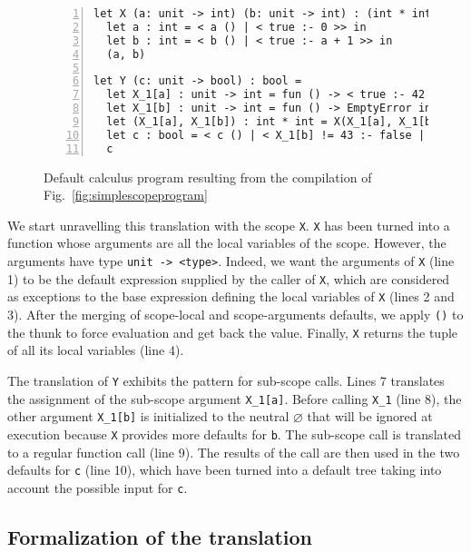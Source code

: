 \documentclass[11pt,a4paper]{article}
\newcommand{\synvar}[1]{\ensuremath{#1}}
\newcommand{\synemptydefault}{\synvar{\varnothing}}
\begin{document}
\begin{figure}
\begin{Verbatim}[frame=lines,label=Simple default program, numbers=left, framesep=10pt, samepage=true]
let X (a: unit -> int) (b: unit -> int) : (int * int) =
  let a : int = < a () | < true :- 0 >> in
  let b : int = < b () | < true :- a + 1 >> in 
  (a, b)

let Y (c: unit -> bool) : bool = 
  let X_1[a] : unit -> int = fun () -> < true :- 42 > in
  let X_1[b] : unit -> int = fun () -> EmptyError in 
  let (X_1[a], X_1[b]) : int * int = X(X_1[a], X_1[b]) in 
  let c : bool = < c () | < X_1[b] != 43 :- false | X_1[b] == 43 :- true >> in 
  c 
\end{Verbatim}
\caption{Default calculus program resulting from the compilation of Fig.~\ref{fig:simplescopeprogram}
\label{fig:simpledefaultprogram}}
\end{figure}

We start unravelling this translation with the scope \Verb+X+. \Verb+X+ has 
been turned into a function whose arguments are all the local variables of the 
scope. However, the arguments have type \Verb+unit -> <type>+. Indeed, we want the 
arguments of \Verb+X+ (line 1) to be the default expression supplied by the caller of
\Verb+X+, which are considered as exceptions to the base 
expression defining the local variables of \Verb+X+ (lines 2 and 3). 
After the merging of scope-local and 
scope-arguments defaults, we apply 
\Verb+()+ to the thunk to force evaluation and get back the value.
Finally, \Verb+X+ returns the tuple of all its local variables (line 4).

The translation of \Verb+Y+ exhibits the pattern for sub-scope calls.
Lines 7 translates the assignment of the sub-scope argument \Verb+X_1[a]+.
Before calling \Verb+X_1+ (line 8), the other argument \Verb+X_1[b]+ is 
initialized to the neutral \synemptydefault{} that will be ignored at execution 
because \Verb+X+ provides more defaults for \Verb+b+.
The sub-scope call is translated to a regular 
function call (line 9). The results of the call are then used in the two defaults  
for \Verb+c+ (line 10), which have been turned into a default tree taking into 
account the possible input for \Verb+c+.

\subsection{Formalization of the translation}
\label{sec:scope:formalization}
\end{document}
